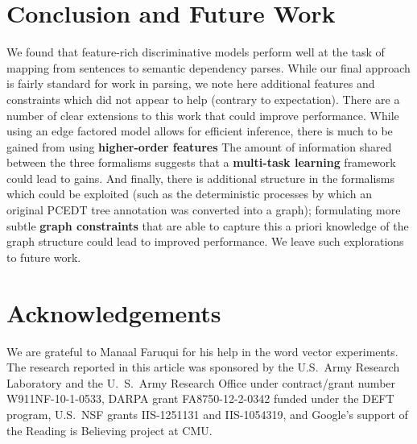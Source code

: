 \documentclass[11pt]{article}
\begin{document}
\section{Conclusion and Future Work}
We found that feature-rich discriminative models perform well at the task of
mapping from sentences to semantic dependency parses. 
While our final approach is fairly standard for work in parsing, we
note here additional features and constraints which did not
appear to help (contrary to expectation).
There are a number of clear extensions to this work that could improve
performance.
While using an edge factored model allows for efficient inference, there is
much to be gained from using \textbf{higher-order features} \cite{mcdonald_online_2006,martins_turning_2013}
The amount of information
shared between the three formalisms suggests that a \textbf{multi-task learning} framework
could lead to gains.
And finally, there is additional structure in the formalisms which could be
exploited (such as the deterministic processes by which an original PCEDT tree annotation was converted into a graph); formulating more subtle \textbf{graph constraints} that are able to capture this a priori
knowledge of the graph structure could lead to improved performance.  We leave such explorations to future work.



\small
\section*{Acknowledgements}
We are grateful to Manaal Faruqui for his help in the word vector experiments.
The research reported in this article was sponsored by the U.S.~Army Research
Laboratory and the U.~S.~Army Research Office under contract/grant number
W911NF-10-1-0533, DARPA grant FA8750-12-2-0342 funded under the DEFT
program, U.S.~NSF grants IIS-1251131 and IIS-1054319, and Google's
support of the Reading is Believing project at CMU.




\end{document}
